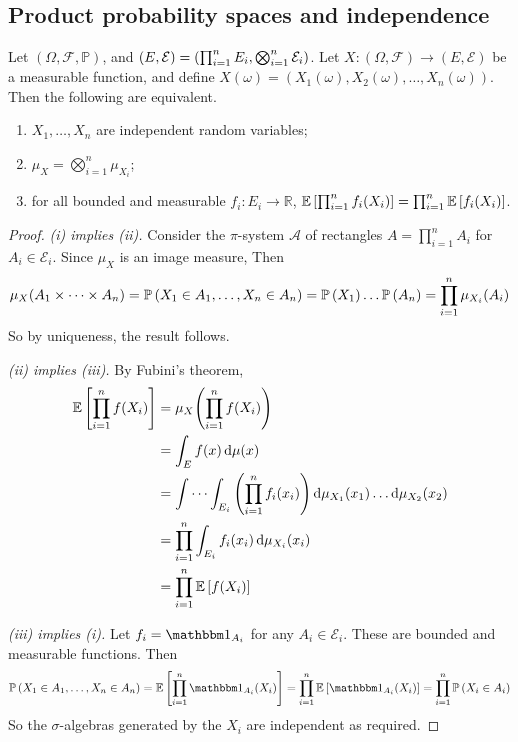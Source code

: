 \subsection{Product probability spaces and independence}
\begin{proposition}
	Let \( (\Omega, \mathcal F, \mathbb P) \), and \( (E, \mathcal E) = \qty(\prod_{i=1}^n E_i, \bigotimes_{i=1}^n \mathcal E_i) \).
	Let \( X \colon (\Omega, \mathcal F) \to (E, \mathcal E) \) be a measurable function, and define \( X(\omega) = (X_1(\omega), X_2(\omega), \dots, X_n(\omega)) \).
	Then the following are equivalent.
	\begin{enumerate}
		\item \( X_1, \dots, X_n \) are independent random variables;
		\item \( \mu_X = \bigotimes_{i=1}^n \mu_{X_i} \);
		\item for all bounded and measurable \( f_i \colon E_i \to \mathbb R \), \( \mathbb{E}\left[{\prod_{i=1}^n f_i(X_i)}\right] = \prod_{i=1}^n \mathbb{E}\left[{f_i(X_i)}\right] \).
	\end{enumerate}
\end{proposition}
\begin{proof}
	\emph{(i) implies (ii).}
	Consider the \( \pi \)-system \( \mathcal A \) of rectangles \( A = \prod_{i=1}^n A_i \) for \( A_i \in \mathcal E_i \).
	Since \( \mu_X \) is an image measure,
	Then
	\[ \mu_X(A_1 \times \dots \times A_n) = \mathbb{P}\left({X_1 \in A_1, \dots, X_n \in A_n}\right) = \mathbb{P}\left({X_1}\right) \dots \mathbb{P}\left({A_n}\right) = \prod_{i=1}^n \mu_{X_i}(A_i) \]
	So by uniqueness, the result follows.

	\emph{(ii) implies (iii).}
	By Fubini's theorem,
	\begin{align*}
		\mathbb{E}\left[{\prod_{i=1}^n f(X_i)}\right] &= \mu_X\qty(\prod_{i=1}^n f(X_i)) \\
		&= \int_E f(x) \dd{\mu(x)} \\
		&= \idotsint_{E_i} \qty(\prod_{i=1}^n f_i(x_i)) \dd{\mu_{X_1}(x_1)} \dots \dd{\mu_{X_2}(x_2)} \\
		&= \prod_{i=1}^n \int_{E_i} f_i(x_i) \dd{\mu_{X_i}(x_i)} \\
		&= \prod_{i=1}^n \mathbb{E}\left[{f(X_i)}\right]
	\end{align*}

	\emph{(iii) implies (i).}
	Let \( f_i = \mathbbm 1_{A_i} \) for any \( A_i \in \mathcal E_i \).
	These are bounded and measurable functions.
	Then
	\[ \prob{X_1 \in A_1, \dots, X_n \in A_n} = \expect{\prod_{i=1}^n \mathbbm 1_{A_i}(X_i)} = \prod_{i=1}^n \expect{\mathbbm 1_{A_i}(X_i)} = \prod_{i=1}^n \prob{X_i \in A_i} \]
	So the \( \sigma \)-algebras generated by the \( X_i \) are independent as required.
\end{proof}
